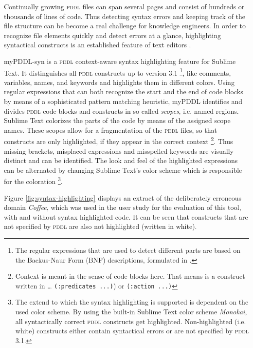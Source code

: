 \documentclass[a4paper,12pt]{report}
\newcommand{\mypddl}{\smallerft[0.8]{myPDDL}\xspace}
\newcommand{\pddl}{\textsc{pddl}\xspace}
\newcommand\smallerft[2][0.85]{{\scalefont{#1}#2}}
\begin{document}
Continually growing \pddl files can span several pages and consist of
hundreds or thousands of lines of code. Thus detecting syntax errors
and keeping track of the file structure can be become a real challenge
for knowledge engineers. In order to recognize file elements quickly
and detect errors at a glance, highlighting syntactical constructs is
an established feature of text editors \cite{reijers2011syntax}.

\mypddl-syn is a \pddl context-aware syntax highlighting feature for
Sublime Text. It distinguishes all \pddl constructs up to version
3.1 \footnote{The regular expressions that are used to detect different
parts are based on the Backus-Naur Form (BNF) descriptions, formulated
in \textcite{kovacs2011bnf,fox2003pddl2,mcdermott1998pddl}.}, like comments, variables, names, and keywords and
highlights them in different colors. Using regular expressions that
can both recognize the start and the end of code blocks by means of a
sophisticated pattern matching heuristic, \mypddl identifies and
divides \pddl code blocks and constructs in so called \emph{scopes}, i.e.
named regions. Sublime Text colorizes the parts of the code by means
of the assigned scope names. These scopes allow for a fragmentation of
the \pddl files, so that constructs are only highlighted, if they
appear in the correct context \footnote{Context is meant in the sense of code blocks here. That means
is a construct written in \ldots{} \texttt{(:predicates ...)}) or \texttt{(:action ...)}}. Thus missing brackets,
misplaced expressions and misspelled keywords are visually distinct
and can be identified. The look and feel of the highlighted
expressions can be alternated by changing Sublime Text's color scheme
which is responsible for the coloration \footnote{The extend to which the syntax highlighting is supported is
dependent on the used color scheme. By using the built-in Sublime Text
color scheme \emph{Monokai}, all syntactically correct \pddl constructs get
highlighted. Non-highlighted (i.e. white) constructs either contain
syntactical errors or are not specified by \pddl3.1.}.

Figure \ref{fig:syntax-highlighting} displays an extract of the
deliberately erroneous domain \emph{Coffee}, which was used in the user
study for the evaluation of this tool, with and without syntax
highlighted code. It can be seen that constructs that are not
specified by \pddl are also not highlighted (written in white).
\end{document}
